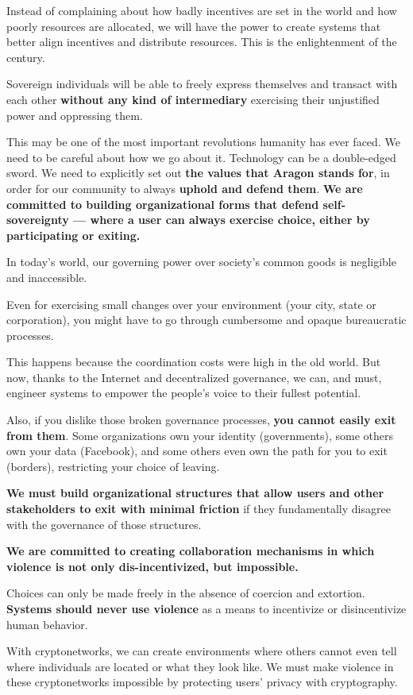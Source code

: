 Instead of complaining about how badly incentives are set in the world and how poorly resources are allocated, we will have the power to create systems that better align incentives and distribute resources. This is the enlightenment of the century.


Sovereign individuals will be able to freely express themselves and transact with each other \textbf{without any kind of intermediary} exercising their unjustified power and oppressing them.

This may be one of the most important revolutions humanity has ever faced. We need to be careful about how we go about it. Technology can be a double-edged sword. We need to explicitly set out \textbf{the values that Aragon stands for}, in order for our community to always \textbf{uphold and defend them}.
\textbf{We are committed to building organizational forms that defend self-sovereignty — where a user can always exercise choice, either by participating or exiting.}

In today's world, our governing power over society's common goods is negligible and inaccessible.

Even for exercising small changes over your environment (your city, state or corporation), you might have to go through cumbersome and opaque bureaucratic processes.

This happens because the coordination costs were high in the old world. But now, thanks to the Internet and decentralized governance, we can, and must, engineer systems to empower the people's voice to their fullest potential.

Also, if you dislike those broken governance processes, \textbf{you cannot easily exit from them}. 
Some organizations own your identity (governments), some others own your data (Facebook), and some others even own the path for you to exit (borders), restricting your choice of leaving.

\textbf{We must build organizational structures that allow users and other stakeholders to exit with minimal friction} if they fundamentally disagree with the governance of those structures.

\textbf{We are committed to creating collaboration mechanisms in which violence is not only dis-incentivized, but impossible.}

Choices can only be made freely in the absence of coercion and extortion. 
\textbf{Systems should never use violence} as a means to incentivize or disincentivize human behavior.

With cryptonetworks, we can create environments where others cannot even tell where individuals are located or what they look like. We must make violence in these cryptonetworks impossible by protecting users' privacy with cryptography.

